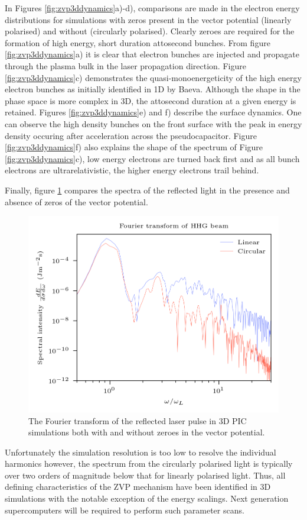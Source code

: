 In Figures \ref{fig:zvp3ddynamics}a)-d), comparisons are made in the electron energy distributions for simulations with zeros present in the vector potential (linearly polarised) and without (circularly polarised). Clearly zeroes are required for the formation of high energy, short duration attosecond bunches. From figure \ref{fig:zvp3ddynamics}a) it is clear that electron bunches are injected and propagate through the plasma bulk in the laser propagation direction. Figure \ref{fig:zvp3ddynamics}c) demonstrates the quasi-monoenergeticity of the high energy electron bunches as initially identified in 1D by Baeva. Although the shape in the phase space is more complex in 3D, the attosecond duration at a given energy is retained. Figures \ref{fig:zvp3ddynamics}e) and f) describe the surface dynamics. One can observe the high density bunches on the front surface with the peak in energy density occuring after acceleration across the pseudocapacitor. Figure \ref{fig:zvp3ddynamics}f) also explains the shape of the spectrum of Figure \ref{fig:zvp3ddynamics}c), low energy electrons are turned back first and as all bunch electrons are ultrarelativistic, the higher energy electrons trail behind.

Finally, figure \ref{fig:zvphhgbeamfourier} compares the spectra of the reflected light in the presence and absence of zeros of the vector potential.
\begin{figure}
	\centering
	\includegraphics[width=0.7\linewidth]{figures/zvp/zvp_hhg_beam_fourier}
	\caption[The Fourier transform of the reflected laser pulse in 3D PIC simulations.]{The Fourier transform of the reflected laser pulse in 3D PIC simulations both with and without zeroes in the vector potential.}
	\label{fig:zvphhgbeamfourier}
\end{figure}
Unfortunately the simulation resolution is too low to resolve the individual harmonics however, the spectrum from the circularly polarised light is typically over two orders of magnitude below that for linearly polarised light. Thus, all defining characteristics of the ZVP mechanism have been identified in 3D simulations with the notable exception of the energy scalings. Next generation supercomputers will be required to perform such parameter scans.

